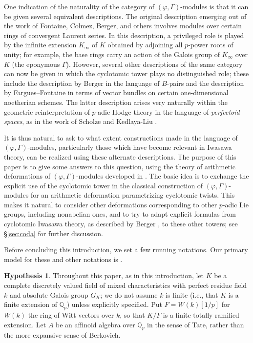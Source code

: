 \documentclass[12pt]{amsart}
\theoremstyle{definition}
\newtheorem{hypothesis}[theorem]{Hypothesis}
\numberwithin{equation}{theorem}
\newcommand{\QQ}{\mathbb{Q}}
\begin{document}
One indication of the naturality of the category of $(\varphi, \Gamma)$-modules is that it can be given several equivalent descriptions. The original description emerging out of the work of Fontaine, Colmez, Berger, and others involves modules over certain rings of convergent Laurent series. In this description, a privileged role is played by the infinite extension $K_\infty$ of $K$ obtained by adjoining all $p$-power roots of unity; for example, the base rings carry an action of the Galois group of $K_\infty$ over $K$ (the eponymous $\Gamma$). However, several other descriptions of the same category can now be given in which the cyclotomic tower plays no distinguished role; these include the description by Berger in the language of $B$-pairs and the description by Fargues--Fontaine in terms of vector bundles on certain one-dimensional noetherian schemes. The latter description arises very naturally within the geometric reinterpretation of $p$-adic Hodge theory in the language of \emph{perfectoid spaces}, as in the work of Scholze \cite{scholze1, scholze2, scholze-icm} and Kedlaya-Liu \cite{kedlaya-liu1, kedlaya-liu2}.

It is thus natural to ask to what extent constructions made in the language of $(\varphi, \Gamma)$-modules, particularly those which have become relevant in Iwasawa theory, can be realized using these alternate descriptions. The purpose of this paper is to give some answers to this question, using the theory of arithmetic deformations of $(\varphi, \Gamma)$-modules developed in \cite{kpx}. The basic idea is to exchange the explicit use of the cyclotomic tower in the classical construction of $(\varphi, \Gamma)$-modules for an arithmetic deformation parametrizing cyclotomic twists. This makes it natural to consider other deformations corresponding to other $p$-adic Lie groups, including nonabelian ones, and to try to adapt explicit formulas from cyclotomic Iwasawa theory,
as described by Berger \cite{berger-explicit}, to these other towers;
see \S\ref{sec:coda} for further discussion.

Before concluding this introduction, we set a few running notations. Our primary model for these and other notations is \cite{kpx}.
\setcounter{theorem}{0}
\begin{hypothesis}
Throughout this paper, as in this introduction, let $K$ be a complete discretely valued field of mixed characteristics with perfect residue field $k$ and absolute Galois group $G_K$; we do not assume $k$ is finite (i.e., that $K$ is a finite extension of $\QQ_p$) unless explicitly specified.
Put $F = W(k)[1/p]$ for $W(k)$ the ring of Witt vectors over $k$, so that $K/F$ is a finite totally ramified extension.
Let $A$ be an affinoid algebra over $\QQ_p$ in the sense of Tate, rather than the more expansive sense of Berkovich. 
\end{hypothesis}
\end{document}
